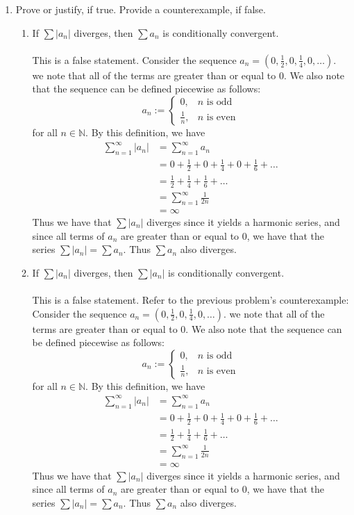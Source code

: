 \documentclass[12pt,letterpaper]{article}
\newcommand{\N}{\mathbb{N}}
\theoremstyle{case}
\theoremstyle{definition}
\begin{document}
\begin{enumerate}
		\item Prove or justify, if true. Provide a counterexample, if false.
		\begin{enumerate}
			\item If $\sum |a_n|$ diverges, then $\sum a_n$ is conditionally convergent.
			\\\\This is a false statement. Consider the sequence $a_n=(0,\frac{1}{2},0,\frac{1}{4},0,\dots)$. we note that all of the terms are greater than or equal to 0. We also note that the sequence can be defined piecewise as follows:
			\[a_n:=\begin{cases}
			0, &n\text{ is odd} \\
			\frac{1}{n}, &n\text{ is even}
			\end{cases}\]
			for all $n \in \N$. By this definition, we have
			\begin{align*}
				\sum_{n=1}^{\infty} |a_n| &= \sum_{n=1}^{\infty} a_n \\
				&= 0+\frac{1}{2}+0+\frac{1}{4}+0+\frac{1}{6}+\dots \\
				&= \frac{1}{2}+\frac{1}{4}+\frac{1}{6}+\dots \\
				&= \sum_{n=1}^{\infty} \frac{1}{2n} \\
				&= \infty
			\end{align*}
			Thus we have that $\sum |a_n|$ diverges since it yields a harmonic series, and since all terms of $a_n$ are greater than or equal to 0, we have that the series $\sum |a_n|=\sum a_n$. Thus $\sum a_n$ also diverges.\\
			
			\item If $\sum |a_n|$ diverges, then $\sum |a_n|$ is conditionally convergent.
			\\\\This is a false statement. Refer to the previous problem's counterexample: Consider the sequence $a_n=(0,\frac{1}{2},0,\frac{1}{4},0,\dots)$. we note that all of the terms are greater than or equal to 0. We also note that the sequence can be defined piecewise as follows:
			\[a_n:=\begin{cases}
			0, &n\text{ is odd} \\
			\frac{1}{n}, &n\text{ is even}
			\end{cases}\]
			for all $n \in \N$. By this definition, we have
			\begin{align*}
			\sum_{n=1}^{\infty} |a_n| &= \sum_{n=1}^{\infty} a_n \\
			&= 0+\frac{1}{2}+0+\frac{1}{4}+0+\frac{1}{6}+\dots \\
			&= \frac{1}{2}+\frac{1}{4}+\frac{1}{6}+\dots \\
			&= \sum_{n=1}^{\infty} \frac{1}{2n} \\
			&= \infty
			\end{align*}
			Thus we have that $\sum |a_n|$ diverges since it yields a harmonic series, and since all terms of $a_n$ are greater than or equal to 0, we have that the series $\sum |a_n|=\sum a_n$. Thus $\sum a_n$ also diverges.\\
			

\end{enumerate}
\end{enumerate}
\end{document}

